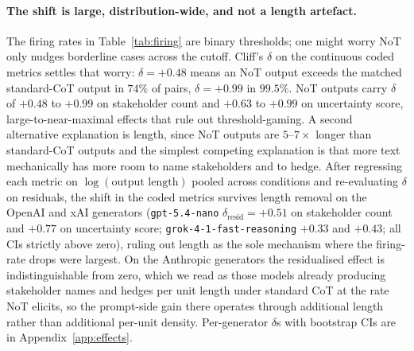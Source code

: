 \documentclass[11pt]{article}
\begin{document}
\paragraph{The shift is large, distribution-wide, and not a length
artefact.} The firing rates in Table~\ref{tab:firing} are binary
thresholds; one might worry NoT only nudges borderline cases
across the cutoff. Cliff's $\delta$ \citep{cliff93} on the continuous
coded metrics settles that worry: $\delta = +0.48$ means an NoT
output exceeds the matched standard-CoT output in $74\%$ of pairs,
$\delta = +0.99$ in $99.5\%$. NoT outputs carry $\delta$ of
$+0.48$ to $+0.99$ on stakeholder count and $+0.63$ to $+0.99$ on
uncertainty score, large-to-near-maximal effects that rule out
threshold-gaming. A second alternative explanation is length, since
NoT outputs are $5$--$7\times$ longer than standard-CoT outputs
and the simplest competing explanation is that more text mechanically
has more room to name stakeholders and to hedge. After regressing
each metric on $\log(\text{output length})$ pooled across conditions
and re-evaluating $\delta$ on residuals, the shift in the coded
metrics survives length removal on the OpenAI and xAI generators
(\texttt{gpt-5.4-nano} $\delta_{\text{resid}} = +0.51$ on stakeholder
count and $+0.77$ on uncertainty score;
\texttt{grok-4-1-fast-reasoning} $+0.33$ and $+0.43$; all CIs
strictly above zero), ruling out length as the sole mechanism where
the firing-rate drops were largest. On the Anthropic generators the
residualised effect is indistinguishable from zero, which we read as
those models already producing stakeholder names and hedges per unit
length under standard CoT at the rate NoT elicits, so the
prompt-side gain there operates through additional length rather
than additional per-unit density. Per-generator $\delta$s with
bootstrap CIs are in Appendix~\ref{app:effects}.
\end{document}
